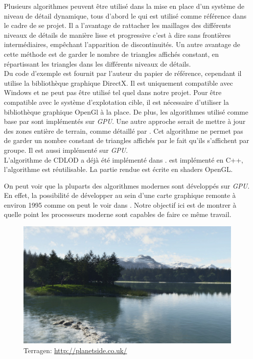 \documentclass[12pt]{report}
\begin{document}
Plusieurs algorithmes peuvent être utilisé dans la mise en place d'un
système de niveau de détail dynamique, tous d'abord le \cite{CDLOD} qui
est utilisé comme référence dans le cadre de se projet.  Il a l'avantage
de rattacher les maillages des différents niveaux de détails de manière
lisse et progressive c'est à dire sans frontières intermédiaires,
empêchant l'apparition de discontinuités.  Un autre avantage de cette
méthode est de garder le nombre de triangles affichés constant, en
répartissant les triangles dans les différents niveaux de détails.\\
Du code d'exemple est fournit par l'auteur du papier de référence,
cependant il utilise la bibliothèque graphique DirectX. Il est
uniquement compatible avec Windows et ne peut pas être utilisé tel quel
dans notre projet.  Pour être compatible avec le système d'explotation
cible, il est nécessaire d'utiliser la bibliothèque graphique OpenGl à la
place. De plus, les algorithmes utilisé comme base par \cite{CDLOD} sont
implémentés sur \emph{GPU}.  Une autre approche serait de mettre à jour
des zones entière de terrain, comme détaillé par \cite{MassiveTerrain}.
Cet algorithme ne permet pas de garder un nombre constant de triangles
affichés par le fait qu'ils s'affichent par groupe. Il est aussi
implémenté sur \emph{GPU}.\\
L'algorithme de CDLOD a déjà été implémenté dans \cite{WorldGenerator}.
\cite{WorldGenerator} est implémenté en C++, l'algorithme est
réutilisable. La partie rendue est écrite en shaders OpenGL.

On peut voir que la pluparts des algorithmes modernes sont développés
sur \emph{GPU}.  En effet, la possibilité de développer au sein d'une
carte graphique remonte à environ 1995 comme on peut le voir dans
\cite{EvoGPU}. Notre objectif ici est de montrer à quelle point les
processeurs moderne sont capables de faire ce même travail.

\begin{center}
\begin{figure}[!h]
  \includegraphics[scale=0.2]{img/Lake.jpg}
  \caption{Terragen: \protect\url{http://planetside.co.uk/}}
  \label{fig:Terragen}
\end{figure}
\end{center}
\end{document}
